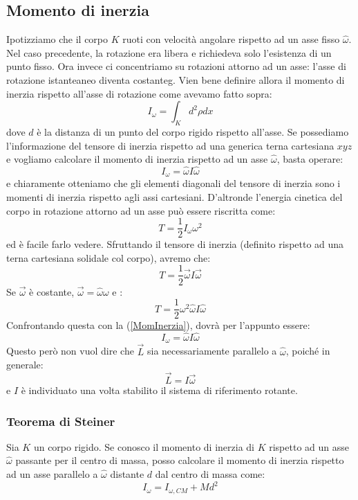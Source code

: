 \documentclass[a4paper,openany]{article}
\begin{document}
	\subsection{Momento di inerzia}
	Ipotizziamo che il corpo $K$ ruoti con velocità angolare rispetto ad un asse fisso $\hat{\omega}$. Nel caso precedente, la rotazione era libera e richiedeva solo l'esistenza di un punto fisso. Ora invece ci concentriamo su rotazioni attorno ad un asse: l'asse di rotazione istanteaneo diventa costanteg. Vien bene definire allora il momento di inerzia rispetto all'asse di rotazione come avevamo fatto sopra:
	$$
	I_{\omega} = \int_{K}d^{2}\rho dx
	$$
	dove $d$ è la distanza di un punto del corpo rigido rispetto all'asse. Se possediamo l'informazione del tensore di inerzia rispetto ad una generica terna cartesiana $xyz$ e vogliamo calcolare il momento di inerzia rispetto ad un asse $\hat{\omega}$, basta operare:
	$$
	I_{\omega} = \hat{\omega}I\hat{\omega}
	$$
	e chiaramente otteniamo che gli elementi diagonali del tensore di inerzia sono i momenti di inerzia rispetto agli assi cartesiani. D'altronde l'energia cinetica del corpo in rotazione attorno ad un asse può essere riscritta come:
	\begin{equation}
		T = \dfrac{1}{2}I_{\omega}\omega^{2}
		\label{MomInerzia}
	\end{equation}
	ed è facile farlo vedere. Sfruttando il tensore di inerzia (definito rispetto ad una terna cartesiana solidale col corpo), avremo che:
	$$
	T = \dfrac{1}{2}\vec{\omega}I\vec{\omega}
	$$
	Se $\vec{\omega}$ è costante, $\vec{\omega}=\hat{\omega}\omega$ e :
	$$
	T = \dfrac{1}{2}\omega^{2}\hat{\omega}I\hat{\omega}
	$$
	Confrontando questa con la (\ref{MomInerzia}), dovrà per l'appunto essere:
	$$
	I_{\omega} = \hat{\omega}I\hat{\omega}
	$$
	Questo però non vuol dire che $\vec{L}$ sia necessariamente parallelo a $\hat{\omega}$, poiché in generale:
	$$
	\vec{L} = I\vec{\omega}
	$$
	e $I$ è individuato una volta stabilito il sistema di riferimento rotante.
	
	
	\subsubsection{Teorema di Steiner}
	Sia $K$ un corpo rigido. Se conosco il momento di inerzia di $K$ rispetto ad un asse $\hat{\omega}$ passante per il centro di massa, posso calcolare il momento di inerzia rispetto ad un asse parallelo a $\hat{\omega}$ distante $d$ dal centro di massa come:
	$$
	I_{\omega} = I_{\omega, CM} + Md^{2}
	$$
\end{document}
